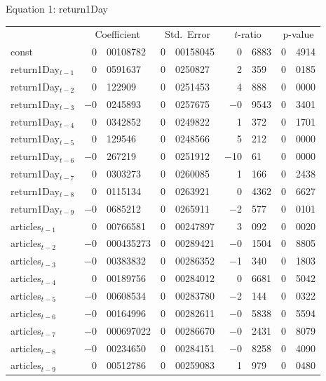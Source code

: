 \begin{center}

Equation 1: return1Day\\

\vspace{1em}

\begin{tabular}{lr@{.}lr@{.}lr@{.}lr@{.}l}
    &
    \multicolumn{2}{c}{Coefficient} &
    \multicolumn{2}{c}{Std.\ Error} &
    \multicolumn{2}{c}{$t$-ratio} &
    \multicolumn{2}{c}{p-value} \\[1ex]
const &
    0&00108782 &
    0&00158045 &
        0&6883 &
        0&4914 \\
return1Day$_{t-1}$ &
    0&0591637 &
    0&0250827 &
        2&359 &
        0&0185 \\
return1Day$_{t-2}$ &
    0&122909 &
    0&0251453 &
        4&888 &
        0&0000 \\
return1Day$_{t-3}$ &
    $-$0&0245893 &
    0&0257675 &
        $-$0&9543 &
        0&3401 \\
return1Day$_{t-4}$ &
    0&0342852 &
    0&0249822 &
        1&372 &
        0&1701 \\
return1Day$_{t-5}$ &
    0&129546 &
    0&0248566 &
        5&212 &
        0&0000 \\
return1Day$_{t-6}$ &
    $-$0&267219 &
    0&0251912 &
        $-$10&61 &
        0&0000 \\
return1Day$_{t-7}$ &
    0&0303273 &
    0&0260085 &
        1&166 &
        0&2438 \\
return1Day$_{t-8}$ &
    0&0115134 &
    0&0263921 &
        0&4362 &
        0&6627 \\
return1Day$_{t-9}$ &
    $-$0&0685212 &
    0&0265911 &
        $-$2&577 &
        0&0101 \\
articles$_{t-1}$ &
    0&00766581 &
    0&00247897 &
        3&092 &
        0&0020 \\
articles$_{t-2}$ &
    $-$0&000435273 &
    0&00289421 &
        $-$0&1504 &
        0&8805 \\
articles$_{t-3}$ &
    $-$0&00383832 &
    0&00286352 &
        $-$1&340 &
        0&1803 \\
articles$_{t-4}$ &
    0&00189756 &
    0&00284012 &
        0&6681 &
        0&5042 \\
articles$_{t-5}$ &
    $-$0&00608534 &
    0&00283780 &
        $-$2&144 &
        0&0322 \\
articles$_{t-6}$ &
    $-$0&00164996 &
    0&00282611 &
        $-$0&5838 &
        0&5594 \\
articles$_{t-7}$ &
    $-$0&000697022 &
    0&00286670 &
        $-$0&2431 &
        0&8079 \\
articles$_{t-8}$ &
    $-$0&00234650 &
    0&00284151 &
        $-$0&8258 &
        0&4090 \\
articles$_{t-9}$ &
    0&00512786 &
    0&00259083 &
        1&979 &
        0&0480 \\
\end{tabular}


\end{center}
